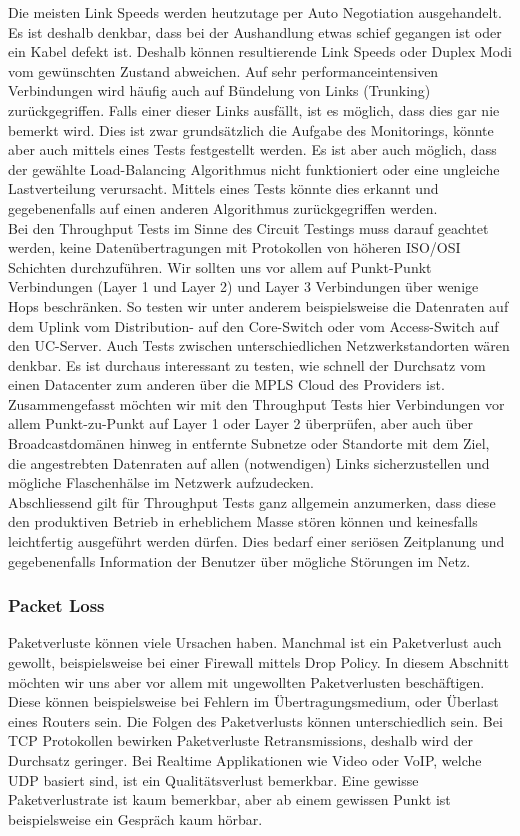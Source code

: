 \documentclass[a4,12pt]{scrartcl}
\begin{document}
\noindent Die meisten Link Speeds werden heutzutage per Auto Negotiation ausgehandelt. Es ist deshalb denkbar, dass bei der Aushandlung etwas schief gegangen ist oder ein Kabel defekt ist. Deshalb können resultierende Link Speeds oder Duplex Modi vom gewünschten Zustand abweichen. Auf sehr performanceintensiven Verbindungen wird häufig auch auf Bündelung von Links (Trunking) zurückgegriffen. Falls einer dieser Links ausfällt, ist es möglich, dass dies gar nie bemerkt wird. Dies ist zwar grundsätzlich die Aufgabe des Monitorings, könnte aber auch mittels eines Tests festgestellt werden. Es ist aber auch möglich, dass der gewählte Load-Balancing Algorithmus nicht funktioniert oder eine ungleiche Lastverteilung verursacht. Mittels eines Tests könnte dies erkannt und gegebenenfalls auf einen anderen Algorithmus zurückgegriffen werden.\\

\noindent
Bei den Throughput Tests im Sinne des Circuit Testings muss darauf geachtet werden, keine Datenübertragungen mit Protokollen von höheren ISO/OSI Schichten durchzuführen. Wir sollten uns vor allem auf Punkt-Punkt Verbindungen (Layer 1 und Layer 2) und Layer 3 Verbindungen über wenige Hops beschränken. So testen wir unter anderem beispielsweise die Datenraten auf dem Uplink vom Distribution- auf den Core-Switch oder vom Access-Switch auf den UC-Server. Auch Tests zwischen unterschiedlichen Netzwerkstandorten wären denkbar. Es ist durchaus interessant zu testen, wie schnell der Durchsatz vom einen Datacenter zum anderen über die MPLS Cloud des Providers ist. Zusammengefasst möchten wir mit den Throughput Tests hier Verbindungen vor allem Punkt-zu-Punkt auf Layer 1 oder Layer 2 überprüfen, aber auch über Broadcastdomänen hinweg in entfernte Subnetze oder Standorte mit dem Ziel, die angestrebten Datenraten auf allen (notwendigen) Links sicherzustellen und mögliche Flaschenhälse im Netzwerk aufzudecken.\\

\noindent Abschliessend gilt für Throughput Tests ganz allgemein anzumerken, dass diese den produktiven Betrieb in erheblichem Masse stören können und keinesfalls leichtfertig ausgeführt werden dürfen. Dies bedarf einer seriösen Zeitplanung und gegebenenfalls Information der Benutzer über mögliche Störungen im Netz.

\subsubsection{Packet Loss} 
Paketverluste können viele Ursachen haben. Manchmal ist ein Paketverlust auch gewollt, beispielsweise bei einer Firewall mittels Drop Policy. In diesem Abschnitt möchten wir uns aber vor allem mit ungewollten Paketverlusten beschäftigen. Diese können beispielsweise bei Fehlern im Übertragungsmedium, oder Überlast eines Routers sein. Die Folgen des Paketverlusts können unterschiedlich sein. Bei TCP Protokollen bewirken Paketverluste Retransmissions, deshalb wird der Durchsatz geringer. Bei Realtime Applikationen wie Video oder VoIP, welche UDP basiert sind, ist ein Qualitätsverlust bemerkbar. Eine gewisse Paketverlustrate ist kaum bemerkbar, aber ab einem gewissen Punkt ist beispielsweise ein Gespräch kaum hörbar.\\
\end{document}
